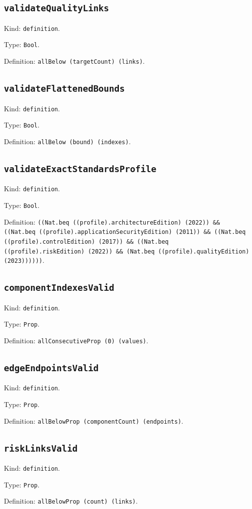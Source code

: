 \documentclass[11pt]{article}
\begin{document}
\subsection*{\texttt{validateQualityLinks}}
\noindent Kind: \texttt{definition}.\par
\noindent Type: \texttt{Bool}.\par
\noindent Definition: \texttt{allBelow (targetCount) (links)}.\par
\subsection*{\texttt{validateFlattenedBounds}}
\noindent Kind: \texttt{definition}.\par
\noindent Type: \texttt{Bool}.\par
\noindent Definition: \texttt{allBelow (bound) (indexes)}.\par
\subsection*{\texttt{validateExactStandardsProfile}}
\noindent Kind: \texttt{definition}.\par
\noindent Type: \texttt{Bool}.\par
\noindent Definition: \texttt{((Nat.beq ((profile).architectureEdition) (2022)) \&\& ((Nat.beq ((profile).applicationSecurityEdition) (2011)) \&\& ((Nat.beq ((profile).controlEdition) (2017)) \&\& ((Nat.beq ((profile).riskEdition) (2022)) \&\& (Nat.beq ((profile).qualityEdition) (2023))))))}.\par
\subsection*{\texttt{componentIndexesValid}}
\noindent Kind: \texttt{definition}.\par
\noindent Type: \texttt{Prop}.\par
\noindent Definition: \texttt{allConsecutiveProp (0) (values)}.\par
\subsection*{\texttt{edgeEndpointsValid}}
\noindent Kind: \texttt{definition}.\par
\noindent Type: \texttt{Prop}.\par
\noindent Definition: \texttt{allBelowProp (componentCount) (endpoints)}.\par
\subsection*{\texttt{riskLinksValid}}
\noindent Kind: \texttt{definition}.\par
\noindent Type: \texttt{Prop}.\par
\noindent Definition: \texttt{allBelowProp (count) (links)}.\par
\end{document}
